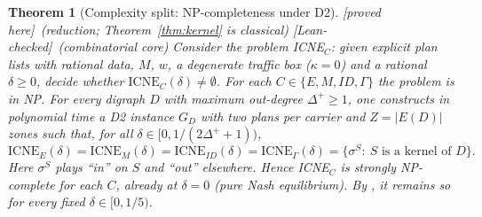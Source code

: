 \documentclass[11pt]{article}
\newtheorem{theorem}{Theorem}[section]
\theoremstyle{definition}
\theoremstyle{remark}
\newcommand{\ICNE}{\mathrm{ICNE}}
\newcommand{\PROVED}{\textsf{[proved here]}}
\newcommand{\LEAN}{\textsf{[Lean-checked]}}
\begin{document}
\begin{theorem}[Complexity split: NP-completeness under D2]\label{thm:np} \PROVED\ (reduction; Theorem~\ref{thm:kernel} is classical) \LEAN\ (combinatorial core)
Consider the problem \textsc{ICNE}$_C$: given explicit plan lists with rational data, $M$, $w$, a degenerate traffic box ($\kappa=0$) and a rational $\delta\ge0$, decide whether $\ICNE_C(\delta)\neq\emptyset$. For each $C\in\{E,M,ID,\Gamma\}$ the problem is in NP. For every digraph $D$ with maximum out-degree $\Delta^+\ge1$, one constructs in polynomial time a D2 instance $G_D$ with two plans per carrier and $Z=|E(D)|$ zones such that, for all $\delta\in[0,1/(2\Delta^++1))$,
\[\ICNE_E(\delta)=\ICNE_M(\delta)=\ICNE_{ID}(\delta)=\ICNE_\Gamma(\delta)=\{\sigma^S:\ S\text{ is a kernel of }D\}.\]
Here $\sigma^S$ plays ``in'' on $S$ and ``out'' elsewhere. Hence \textsc{ICNE}$_C$ is strongly NP-complete for each $C$, already at $\delta=0$ (pure Nash equilibrium). By \cite{Fraenkel81}, it remains so for every fixed $\delta\in[0,1/5)$.
\end{theorem}
\end{document}
